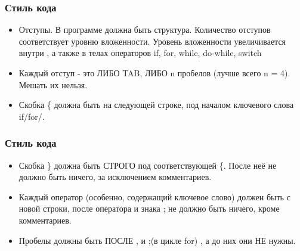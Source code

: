 \documentclass[12pt,pdf,hyperref={unicode}]{beamer}
\begin{document}
\begin{frame}
\frametitle{Стиль кода} 

\begin{itemize}
\item Отступы. В программе должна быть структура.
Количество отступов соответствует уровню вложенности. Уровень вложенности увеличивается внутри { }, а также в телах операторов if, for, while, do-while, switch
\item Каждый отступ - это ЛИБО TAB, ЛИБО n пробелов (лучше всего n = 4). Мешать их нельзя.
\item Скобка \{ должна быть на следующей строке, под началом ключевого слова if/for/.
\end{itemize}


\end{frame}


\begin{frame}
\frametitle{Стиль кода} 

\begin{itemize}
\item Скобка \} должна быть СТРОГО под соответствующей \{. После неё не должно быть ничего, за исключением комментариев.
\item Каждый оператор (особенно, содержащий ключевое слово) должен быть с новой строки, после оператора и знака ; не должно быть ничего, кроме комментариев.
\item Пробелы должны быть ПОСЛЕ , и ;(в цикле for) , а до них они НЕ нужны.
\end{itemize}
\end{frame}
\end{document}
